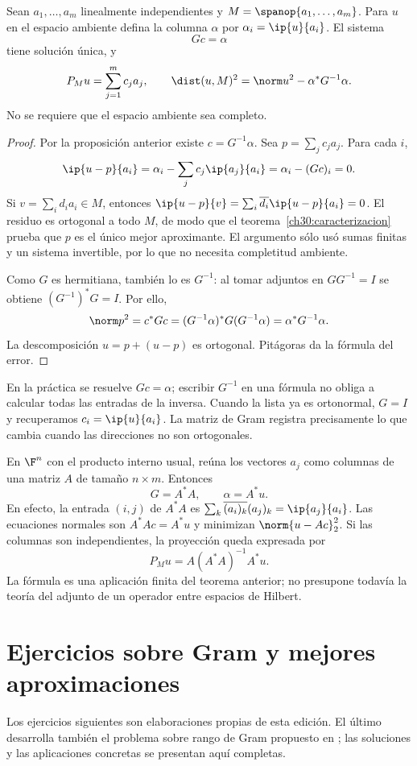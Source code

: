\begin{teorema}\label{ampl:gram-proyeccion}
Sean $a_1,\ldots,a_m$ linealmente independientes y $M=\spanop\{a_1,\ldots,a_m\}$. Para $u$ en el espacio ambiente defina la columna $\alpha$ por $\alpha_i=\ip{u}{a_i}$. El sistema
\[
 Gc=\alpha
\]
tiene solución única, y
\[
 P_Mu=\sum_{j=1}^mc_ja_j,\qquad
 \dist(u,M)^2=\norm u^2-\alpha^*G^{-1}\alpha.
\]
No se requiere que el espacio ambiente sea completo.
\end{teorema}
\begin{proof}
Por la proposición anterior existe $c=G^{-1}\alpha$. Sea $p=\sum_jc_ja_j$. Para cada $i$,
\[
 \ip{u-p}{a_i}=\alpha_i-\sum_jc_j\ip{a_j}{a_i}
 =\alpha_i-(Gc)_i=0.
\]
Si $v=\sum_id_ia_i\in M$, entonces
$\ip{u-p}{v}=\sum_i\overline{d_i}\ip{u-p}{a_i}=0$. El residuo es ortogonal a todo $M$, de modo que el teorema~\ref{ch30:caracterizacion} prueba que $p$ es el único mejor aproximante. El argumento sólo usó sumas finitas y un sistema invertible, por lo que no necesita completitud ambiente.

Como $G$ es hermitiana, también lo es $G^{-1}$: al tomar adjuntos en $GG^{-1}=I$ se obtiene $(G^{-1})^*G=I$. Por ello,
\[
 \norm p^2=c^*Gc=(G^{-1}\alpha)^*G(G^{-1}\alpha)
 =\alpha^*G^{-1}\alpha.
\]
La descomposición $u=p+(u-p)$ es ortogonal. Pitágoras da la fórmula del error.
\end{proof}

En la práctica se resuelve $Gc=\alpha$; escribir $G^{-1}$ en una fórmula no obliga a calcular todas las entradas de la inversa. Cuando la lista ya es ortonormal, $G=I$ y recuperamos $c_i=\ip{u}{a_i}$. La matriz de Gram registra precisamente lo que cambia cuando las direcciones no son ortogonales.

\begin{ejemplo}
En $\F^n$ con el producto interno usual, reúna los vectores $a_j$ como columnas de una matriz $A$ de tamaño $n\times m$. Entonces
\[
 G=A^*A,\qquad \alpha=A^*u.
\]
En efecto, la entrada $(i,j)$ de $A^*A$ es $\sum_k\overline{(a_i)_k}(a_j)_k=\ip{a_j}{a_i}$. Las ecuaciones normales son $A^*Ac=A^*u$ y minimizan $\norm{u-Ac}_2^2$. Si las columnas son independientes, la proyección queda expresada por
\[
 P_Mu=A(A^*A)^{-1}A^*u.
\]
La fórmula es una aplicación finita del teorema anterior; no presupone todavía la teoría del adjunto de un operador entre espacios de Hilbert.
\end{ejemplo}

\section{Ejercicios sobre Gram y mejores aproximaciones}
Los ejercicios siguientes son elaboraciones propias de esta edición. El último desarrolla también el problema sobre rango de Gram propuesto en \cite{max-gram}; las soluciones y las aplicaciones concretas se presentan aquí completas.

